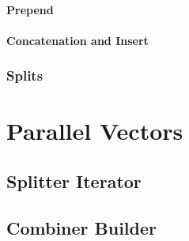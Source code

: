 \paragraph{Prepend}

\paragraph{Concatenation and Insert}



\subsubsection{Splits}



\section{Parallel Vectors}



\subsection{Splitter Iterator}



\subsection{Combiner Builder}



